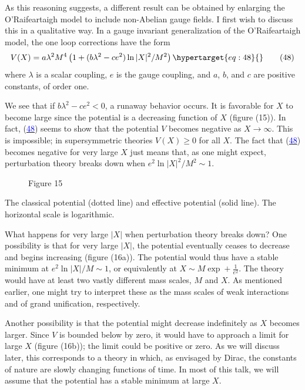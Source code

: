 \documentclass[11pt,a4paper]{article}
\newcommand{\eqtarget}[1]{\hypertarget{eq:#1}{\mathstrut}\tag{#1}}
\newcommand{\eqnref}[1]{(\hyperlink{eq:#1}{\textcolor{blue}{#1}})}
\begin{document}
As this reasoning suggests, a different result can be obtained
by enlarging the O'Raife\-artaigh model to include non-Abelian gauge
fields. I first wish to discuss this in a qualitative way. In a
gauge invariant generalization of the O'Raifeartaigh model, the one
loop corrections have the form
\begin{equation}
V(X) = a\lambda^2 M^4 \left(1 + (b\lambda^2 - ce^2)\ln |X|^2/M^2\right)
\eqtarget{48}
\end{equation}
where $\lambda$ is a scalar coupling, $e$ is the gauge coupling, and $a$, $b$, and
$c$ are positive constants, of order one.

We see that if $b\lambda^2 - ce^2 < 0$, a runaway behavior occurs. It is
favorable for $X$ to become large since the potential is a decreasing
function of $X$ (figure (15)). In
fact, \eqnref{48} seems to show that the
potential $V$ becomes negative as
$X \to \infty$. This is impossible; in
supersymmetric theories $V(X) \geq 0$
for all $X$. The fact that \eqnref{48}
becomes negative for very large $X$
just means that, as one might expect, perturbation theory breaks
down when $e^2 \ln |X|^2/M^2 \sim 1$.

\begin{figure}[h]
\centering

\par\smallskip
Figure 15
\end{figure}

The classical potential (dotted
line) and effective potential
(solid line). The horizontal
scale is logarithmic.

What happens for very large $|X|$ when perturbation theory breaks
down? One possibility is that for very large $|X|$, the potential
eventually ceases to decrease and begins increasing (figure (16a)).
The potential would thus have a stable minimum at $e^2 \ln |X|/M \sim 1$,
or equivalently at $X \sim M \exp + \frac{1}{e^2}$. The theory would have at least
two vastly different mass scales, $M$ and $X$. As mentioned earlier,
one might try to interpret these as the mass scales of weak interactions
and of grand unification, respectively.

Another possibility is that the potential might decrease indefinitely
as $X$ becomes larger. Since $V$ is bounded below by zero,
it would have to approach a limit for large $X$ (figure (16b)); the
limit could be positive or zero. As we will discuss later, this corresponds
to a theory in which, as envisaged by Dirac, the constants
of nature are slowly changing functions of time. In most of this
talk, we will assume that the potential has a stable minimum at
large $X$.
\end{document}
